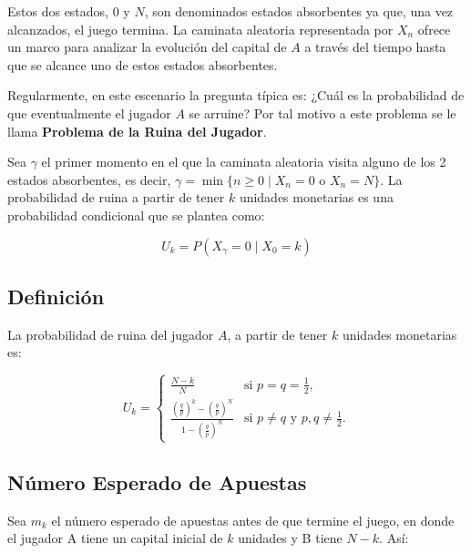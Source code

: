 \documentclass{article}
\begin{document}
\vspace{.25cm}

Estos dos estados, \(0\) y \(N\), son denominados estados absorbentes ya que, una vez alcanzados, el juego termina. La caminata aleatoria representada por \(X_n\) ofrece un marco para analizar la evolución del capital de \(A\) a través del tiempo hasta que se alcance uno de estos estados absorbentes.

\vspace{.25cm}

Regularmente, en este escenario la pregunta típica es: ¿Cuál es la probabilidad de que eventualmente el jugador \( A \) se arruine? Por tal motivo a este problema se le llama \textbf{Problema de la Ruina del Jugador}.

\vspace{.25cm}

Sea \( \gamma \) el primer momento en el que la caminata aleatoria visita alguno de los 2 estados absorbentes, es decir, \( \gamma = \min\{n \geq 0 \mid X_n = 0 \text{ o } X_n = N\} \). La probabilidad de ruina a partir de tener \( k \) unidades monetarias es una probabilidad condicional que se plantea como:

\[ U_k = P(X_\gamma = 0 \mid X_0 = k) \]

\subsection*{Definición}


La probabilidad de ruina del jugador \( A \), a partir de tener \( k \) unidades monetarias es:

\[
    U_k =
    \begin{cases}
        \frac{N - k}{N}                                                                                & \text{si } p = q = \frac{1}{2},                       \\[10pt]
        \frac{\left(\frac{q}{p}\right)^k - \left(\frac{q}{p}\right)^N}{1 - \left(\frac{q}{p}\right)^N} & \text{si } p \neq q \text{ y } p, q \neq \frac{1}{2}.
    \end{cases}
\]

\subsection*{Número Esperado de Apuestas}

Sea \( m_k \) el número esperado de apuestas antes de que termine el juego, en donde el jugador A tiene un capital inicial de \( k \) unidades y B tiene \( N-k \). Así:
\end{document}
